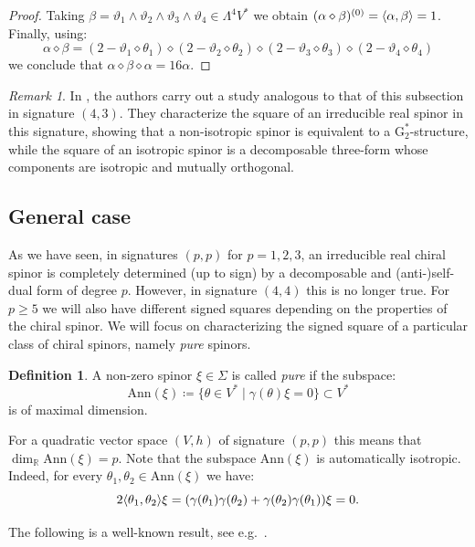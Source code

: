 \documentclass[10pt,reqno]{amsart}
\theoremstyle{definition}
\newtheorem{definition}[theorem]{Definition}
\theoremstyle{remark}
\newtheorem{remark}[theorem]{Remark}
\newcommand{\R}{\mathbb{R}}
\DeclarePairedDelimiter{\escal}{\langle}{\rangle}
\begin{document}
\begin{proof}
    Taking $\beta=\vartheta_1\wedge\vartheta_2\wedge\vartheta_3\wedge\vartheta_4\in\Lambda^4V^*$ we obtain $(\alpha\diamond\beta)^{(0)}=\escal{\alpha,\beta}=1$. Finally, using: $$\alpha\diamond\beta=(2-\vartheta_1\diamond\theta_1)\diamond(2-\vartheta_2\diamond\theta_2)\diamond(2-\vartheta_3\diamond\theta_3)\diamond(2-\vartheta_4\diamond\theta_4)$$ we conclude that $\alpha\diamond\beta\diamond\alpha=16\alpha$.
\end{proof}

\begin{remark}
    In \cite{GS25_G2s}, the authors carry out a study analogous to that of this subsection in signature $(4,3)$. They characterize the square of an irreducible real spinor in this signature, showing that a non-isotropic spinor is equivalent to a $\mathrm{G}_2^*$-structure, while the square of an isotropic spinor is a decomposable three-form whose components are isotropic and mutually orthogonal.
\end{remark}

\subsection{General case}

As we have seen, in signatures $(p,p)$ for $p=1,2,3$, an irreducible real chiral spinor is completely determined (up to sign) by a decomposable and (anti-)self-dual form of degree $p$. However, in signature $(4,4)$ this is no longer true. For $p\geq5$ we will also have different signed squares depending on the properties of the chiral spinor. We will focus on characterizing the signed square of a particular class of chiral spinors, namely \emph{pure} spinors.

\begin{definition}
    A non-zero spinor $\xi\in\Sigma$ is called \emph{pure} if the subspace: $$\mathrm{Ann}(\xi)\coloneqq\{\theta\in V^*\mid\gamma(\theta)\xi=0\}\subset V^*$$ is of maximal dimension.
\end{definition}

For a quadratic vector space $(V,h)$ of signature $(p,p)$ this means that $\dim_\R\mathrm{Ann}(\xi)=p$. Note that the subspace $\mathrm{Ann}(\xi)$ is automatically isotropic. Indeed, for every $\theta_1,\theta_2\in\mathrm{Ann}(\xi)$ we have: $$2\escal{\theta_1,\theta_2}\xi=(\gamma(\theta_1)\gamma(\theta_2)+\gamma(\theta_2)\gamma(\theta_1))\xi=0.$$

The following is a well-known result, see e.g.\ \cite{Chevalley1954,Meinrenken2013}.
\end{document}
